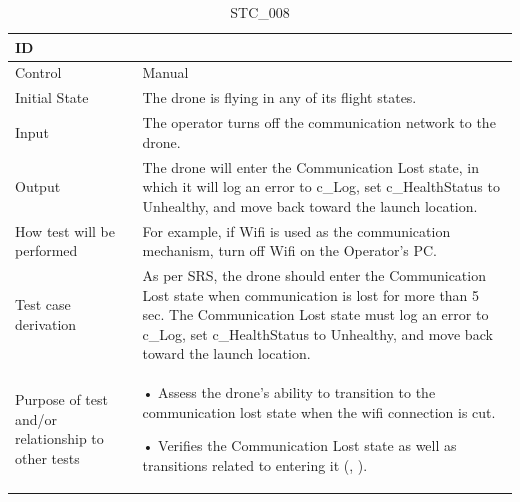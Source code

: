\documentclass[12pt, titlepage]{article}
\begin{document}
\begin{table}[!h]
\begin{center}
\caption {STC\_008}
\label{tab:STC_008}
\begin{tabular}{ | m{3.2cm} | m{12.2cm} | } 
\hline
ID & \nameref{tab:STC_008} \\ 
\hline
Control & Manual \\ 
\hline
Initial State &  The drone is flying in any of its flight states. \\ 
\hline
Input & The operator turns off the communication network to the drone. \\ 
\hline
Output & The drone will enter the Communication Lost state, in which it will log an error to c_Log, set c\_HealthStatus to Unhealthy, and move back toward the launch location. \\ 
\hline
How test will be performed & For example, if Wifi is used as the communication mechanism, turn off Wifi on the Operator's PC. \\ 
\hline
Test case derivation & As per SRS, the drone should enter the Communication Lost state when communication is lost for more than 5 sec. The Communication Lost state must log an error to c_Log, set c\_HealthStatus to Unhealthy, and move back toward the launch location. \\ 
\hline
Purpose of test and/or relationship to other tests & 
• Assess the drone's ability to transition to the communication lost state when the wifi connection is cut.

• Verifies the Communication Lost state as well as transitions related to entering it (\nameref{STA_010}, \nameref{TRANS_010}).  
\\ 
\hline
\end{tabular}
\end{center}
\end{table}
\end{document}
